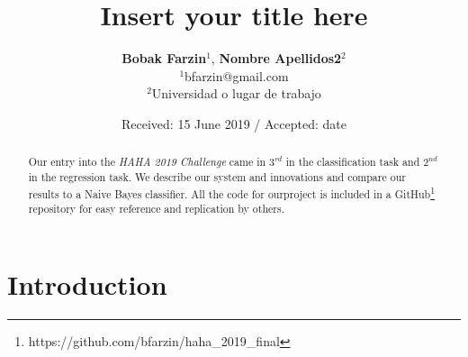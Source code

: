 \documentclass[smallextended]{svjour3}       %
\begin{document}
\title{Insert your title here%
}


\author {\textbf{Bobak Farzin$^1$}, \textbf{Nombre Apellidos2$^2$}\\
	$^1$bfarzin@gmail.com\\
	$^2$Universidad o lugar de trabajo\\
}


\institute{}

\date{Received: 15 June 2019 / Accepted: date}


\maketitle

\begin{abstract}
Our entry into the \textit{HAHA 2019 Challenge} came in $3^{rd}$ in the classification task and $2^{nd}$ in the regression task.  We describe our system and innovations and compare our results to a Naive Bayes classifier.  All the code for ourproject is included in a GitHub\footnote{https://github.com/bfarzin/haha\_2019\_final} repository for easy reference and replication by others.

\end{abstract}

\section{Introduction}
\label{intro}
\newcommand{\chapquote}[3]{\begin{quotation} \textit{#1} \end{quotation} \begin{flushright} - #2, \textit{#3}\end{flushright} }
\end{document}
